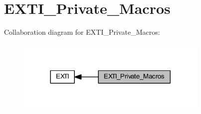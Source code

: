 \hypertarget{group___e_x_t_i___private___macros}{}\section{E\+X\+T\+I\+\_\+\+Private\+\_\+\+Macros}
\label{group___e_x_t_i___private___macros}
Collaboration diagram for E\+X\+T\+I\+\_\+\+Private\+\_\+\+Macros\+:
\nopagebreak
\begin{figure}[H]
\begin{center}
\leavevmode
\includegraphics[width=260pt]{group___e_x_t_i___private___macros}
\end{center}
\end{figure}
